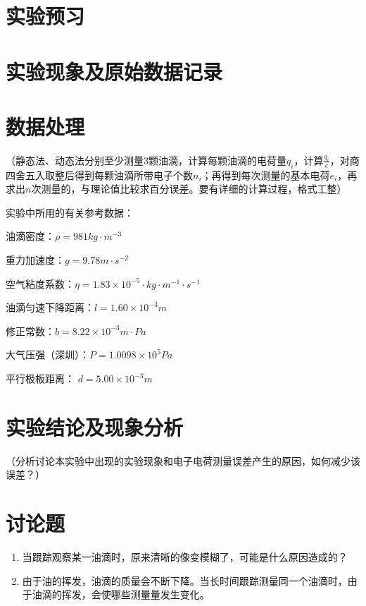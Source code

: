 \documentclass[signature=data]{physicsreport}
\begin{document}
\maketitle

\section{实验预习}


\makeatletter
{}
\makeatother


\section{实验现象及原始数据记录}


\makeatletter
{}
\makeatother

\newpage
\section{数据处理}

    （静态法、动态法分别至少测量$3$颗油滴，计算每颗油滴的电荷量$q_i$，计算$\frac{q_i}{e}$，对商四舍五入取整后得到每颗油滴所带电子个数$n_i$；再得到每次测量的基本电荷$e_i$，再求出$n$次测量的，与理论值比较求百分误差。要有详细的计算过程，格式工整）
    
    实验中所用的有关参考数据：
    
油滴密度：$\rho=981 kg·m^{-3}$

重力加速度：$g=9.78 m·s^{-2}$

空气粘度系数：$\eta=1.83×10^{-5}·kg·m^{-1}·s^{-1}$

油滴匀速下降距离：$l=1.60×10^{-3}m$

修正常数：$b=8.22×10^{-3}m·Pa$

大气压强（深圳）：$P=1.0098×10^{5} Pa$

平行极板距离：	$d=5.00×10^{-3}m$

\vspace{2em}

\section{实验结论及现象分析}
    （分析讨论本实验中出现的实验现象和电子电荷测量误差产生的原因，如何减少该误差？）
    \vspace{2em}
\section{讨论题}
\begin{enumerate}
    \item 当跟踪观察某一油滴时，原来清晰的像变模糊了，可能是什么原因造成的？
    \vspace{3cm}
    \item 由于油的挥发，油滴的质量会不断下降。当长时间跟踪测量同一个油滴时，由于油滴的挥发，会使哪些测量量发生变化。
\end{enumerate}
\end{document}
